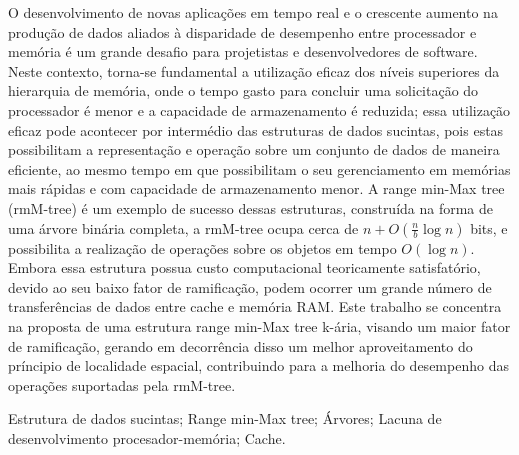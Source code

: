 O desenvolvimento de novas aplicações em tempo real e o crescente aumento na produção de dados aliados à disparidade de desempenho entre processador 
e memória é um grande desafio para projetistas e desenvolvedores de software. Neste contexto, torna-se fundamental a utilização eficaz dos níveis superiores da hierarquia de memória, onde o tempo gasto para concluir uma  solicitação do processador é menor e a capacidade de armazenamento é  reduzida; essa utilização eficaz pode acontecer por intermédio das estruturas 
de dados sucintas, pois estas possibilitam a representação e operação sobre um conjunto de dados de maneira eficiente, ao mesmo tempo em que possibilitam  o seu gerenciamento em memórias mais rápidas e com capacidade de armazenamento menor. A range min-Max tree (rmM-tree) é um exemplo de sucesso dessas estruturas, construída na forma de uma árvore binária completa, a 
rmM-tree ocupa cerca de $n + O(\frac{n}{b} \log n)$ bits, e possibilita a realização de operações sobre os objetos em  tempo $O(\log n)$. Embora essa estrutura possua custo computacional teoricamente  satisfatório, devido ao seu baixo fator de ramificação, podem ocorrer um grande número de transferências de dados entre cache e memória RAM.  Este trabalho se concentra na proposta de uma estrutura range min-Max tree k-ária, visando um maior fator de ramificação, gerando em decorrência disso um melhor aproveitamento do príncipio de localidade espacial, contribuindo para a melhoria do desempenho das operações suportadas pela rmM-tree. 


\begin{keywords}
Estrutura de dados sucintas; Range min-Max tree; Árvores; Lacuna de desenvolvimento procesador-memória; Cache.
\end{keywords}